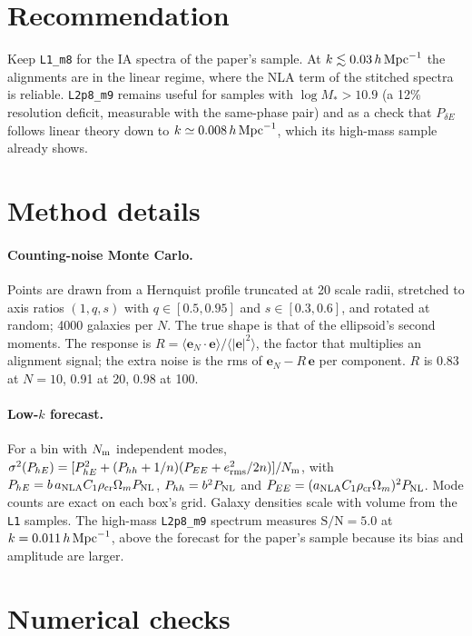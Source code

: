 \documentclass[11pt]{article}
\newcommand{\hMpc}{\,h\,{\rm Mpc}^{-1}}
\newcommand{\Mstar}{M_\ast}
\newcommand{\anla}{a_{\rm NLA}}
\newcommand{\PdE}{P_{\delta E}}
\newcommand{\PhE}{P_{hE}}
\newcommand{\erms}{e_{\rm rms}}
\newcommand{\run}[1]{\texttt{#1}}
\begin{document}
\section{Recommendation}
\label{sec:recommendation}

Keep \run{L1\_m8} for the IA spectra of the paper's sample. At
$k \lesssim 0.03\hMpc$ the alignments are in the linear regime, where the NLA
term of the stitched spectra is reliable. \run{L2p8\_m9} remains useful for
samples with $\log\Mstar > 10.9$ (a 12\% resolution deficit, measurable with
the same-phase pair) and as a check that $\PdE$ follows linear theory down to
$k \simeq 0.008\hMpc$, which its high-mass sample already shows.

\appendix

\section{Method details}
\label{app:method}

\paragraph{Counting-noise Monte Carlo.}
Points are drawn from a Hernquist profile truncated at 20 scale radii,
stretched to axis ratios $(1, q, s)$ with $q \in [0.5, 0.95]$ and
$s \in [0.3, 0.6]$, and rotated at random; 4000 galaxies per $N$. The true
shape is that of the ellipsoid's second moments. The response is
$R = \langle \mathbf{e}_N\cdot\mathbf{e}\rangle / \langle |\mathbf{e}|^2\rangle$, the
factor that multiplies an alignment signal; the extra noise is the rms of
$\mathbf{e}_N - R\,\mathbf{e}$ per component. $R$ is 0.83 at $N=10$, 0.91 at 20,
0.98 at 100.

\paragraph{Low-$k$ forecast.}
For a bin with $N_{\rm m}$ independent modes,
$\sigma^2(\PhE) = [\PhE^2 + (P_{hh} + 1/n)(P_{EE} + \erms^2/2n)]/N_{\rm m}$,
with $\PhE = b\,\anla C_1\rho_{\rm cr}\Omega_m P_{\rm NL}$,
$P_{hh} = b^2P_{\rm NL}$ and $P_{EE} = (\anla C_1\rho_{\rm cr}\Omega_m)^2
P_{\rm NL}$. Mode counts are exact on each box's grid. Galaxy densities scale
with volume from the \run{L1} samples. The high-mass \run{L2p8\_m9} spectrum
measures $\mathrm{S/N} = 5.0$ at $k = 0.011\hMpc$, above the forecast for the
paper's sample because its bias and amplitude are larger.

\section{Numerical checks}
\label{app:checks}
\end{document}
